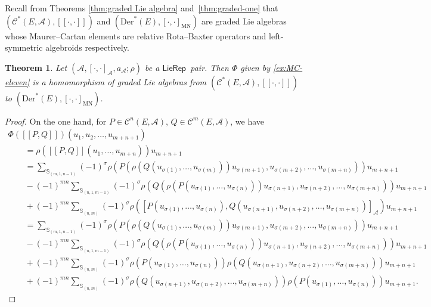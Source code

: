 \documentclass[10pt,a4paper]{amsart}
\numberwithin{equation}{section}
\newtheorem{thm}{Theorem}[section]
\newcommand{\huaA}{\mathcal{A}}
\newcommand{\huaC}{\mathcal{C}}
\newcommand{\Courant}[1]{\left[\!\left[ #1\right]\!\right]}
\newcommand{\Der}{\mathrm{Der}}
\newcommand{\MN}{\mathrm{MN}}
\newcommand{\LP}{$\mathsf{LieRep}$~}
\begin{document}
Recall from Theorems \ref{thm:graded Lie algebra} and~\ref{thm:graded-one} that $(\huaC^*(E,\huaA),\Courant{\cdot,\cdot})$ and $(\Der^*(E),[\cdot,\cdot]_{\MN})$ are graded Lie algebras whose Maurer--Cartan elements are relative Rota--Baxter operators and left-symmetric algebroids respectively.
\begin{thm}\label{thm:homomorphism graded Lie}
Let $(\huaA,[\cdot,\cdot]_\huaA,a_\huaA;\rho)$ be a \LP pair. Then $\Phi $ given by \eqref{ex:MC-eleven} is a homomorphism of graded Lie algebras from $(\huaC^*(E,\huaA),\Courant{\cdot,\cdot})$ to $(\Der^*(E),[\cdot,\cdot]_{\MN})$.
\end{thm}
\begin{proof}
On the one hand, for $P\in\huaC^{n}(E,\huaA)$, $Q\in \huaC^{m}(E,\huaA)$, we have
\begin{gather*}
\Phi(\Courant{P,Q})(u_1,u_2,\dots,u_{m+n+1})
\\ \qquad
{}=\rho(\Courant{P,Q}(u_1,\dots,u_{m+n}))u_{m+n+1}
\\ \qquad
{}=\sum_{\mathbb{S}_{(m,1,n-1)}}(-1)^{\sigma}
\rho(P(\rho(Q(u_{\sigma(1)},\dots,u_{\sigma(m)}))u_{\sigma(m+1)},u_{\sigma(m+2)}, \dots,u_{\sigma(m+n)}))u_{m+n+1}
\\ \qquad
{}-\!(-1)^{mn}\!\!\!\!\!\!\sum_{\mathbb{S}_{(n,1,m-1)}}\!\!\!\!\!(-1)^{\sigma}
\rho(Q(\rho(P(u_{\sigma(1)},\dots,u_{\sigma(n)}))u_{\sigma(n+1)},u_{\sigma(n+2)}, \dots,u_{\sigma(m+n)}))u_{m+n+1}
\\ \qquad
{}+\!(-1)^{mn}\!\!\sum_{\mathbb{S}_{(n,m)}}\!\!(-1)^{\sigma}\!
\rho([P(u_{\sigma(1)},\dots,u_{\sigma(n)}),Q(u_{\sigma(n+1)},u_{\sigma(n+2)}, \dots,u_{\sigma(m+n)})]_{\huaA})u_{m+n+1}
\\ \qquad
{}=\sum_{\mathbb{S}_{(m,1,n-1)}}(-1)^{\sigma}
\rho(P(\rho(Q(u_{\sigma(1)},\dots,u_{\sigma(m)}))u_{\sigma(m+1)},u_{\sigma(m+2)}, \dots,u_{\sigma(m+n)}))u_{m+n+1}
\\ \qquad
{}-\!(-1)^{mn}\!\!\!\!\!\!\sum_{\mathbb{S}_{(n,1,m-1)}}\!\!\!\!\!(-1)^{\sigma}
\rho(Q(\rho(P(u_{\sigma(1)},\dots,u_{\sigma(n)}))u_{\sigma(n+1)},u_{\sigma(n+2)}, \dots,u_{\sigma(m+n)}))u_{m+n+1}
\\ \qquad
{}+\!(-1)^{mn}\sum_{\mathbb{S}_{(n,m)}}\!(-1)^{\sigma}
\rho(P(u_{\sigma(1)},\dots,u_{\sigma(n)}))\rho(Q(u_{\sigma(n+1)},u_{\sigma(n+2)}, \dots,u_{\sigma(m+n)}))u_{m+n+1}
\\ \qquad
{}+\!(-1)^{mn}\!\!\sum_{\mathbb{S}_{(n,m)}}\!(-1)^{\sigma}
\rho(Q(u_{\sigma(n+1)},u_{\sigma(n+2)},\dots,u_{\sigma(m+n)}))\rho(P(u_{\sigma(1)}, \dots,u_{\sigma(n)}))u_{m+n+1}.
\end{gather*}

\end{proof}
\end{document}

